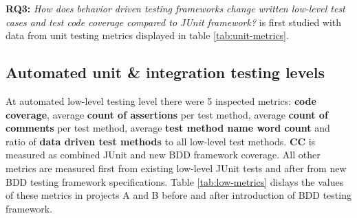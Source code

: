 {\renewcommand{\arraystretch}{1.3}
\begin{table}[H]
        \caption {Unit level testing metrics in projects and their change} \label{tab:unit-metrics}

\end{table}
}

\textbf{RQ3: }\textit{How does behavior driven testing frameworks change written low-level test cases and test code coverage compared to JUnit framework?}
is first studied with data from unit testing metrics displayed in table \ref{tab:unit-metrics}.

\clearpage
\subsection{Automated unit \& integration testing levels}
\label{subsub:low-level-metrics}
At automated low-level testing level there were 5 inspected metrics: \textbf{code coverage}, average \textbf{count of assertions} per test method,
average \textbf{count of comments} per test method, average \textbf{test method name word count} and ratio of \textbf{data driven test methods} to
all low-level test methods. \textbf{CC} is measured as combined JUnit and new BDD framework coverage. All other metrics
are measured first from existing low-level JUnit tests and after from new BDD testing framework specifications.
Table \ref{tab:low-metrics} dislays the values of these metrics in projects A and B before and after introduction of BDD testing framework.


